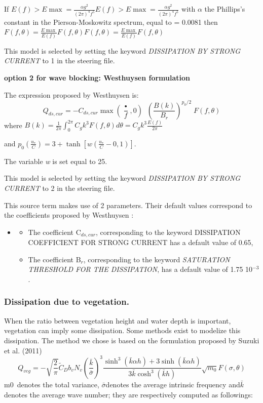 If $E(f)>E\max =\frac{\alpha g^{2} }{\left(2\pi \right)^{4} f^{5} } $$E(f)>E\max =\frac{\alpha g^{2} }{\left(2\pi \right)^{4} f^{5} } $ 
 with $\alpha$ the Phillips's constant in the Pierson-Moskowitz spectrum, equal to = 0.0081 then
$F(f,\theta )=\frac{E\max }{E(f)} F(f,\theta )$$F(f,\theta )=\frac{E\max }{E(f)} F(f,\theta )$

 This model is selected by setting the keyword \textit{DISSIPATION BY STRONG CURRENT }to 1 in the steering file.\textbf{}

{\bf  option 2 for wave blocking: Westhuysen formulation }

 The expression proposed by Westhuysen is:
\[Q_{ds,cur} =-C_{ds,cur} \max \left(\frac{\mathop{f_{r} }\limits^{\bullet } }{f} ,0\right)\; \; \left(\frac{B(k)}{B_{r} } \right)^{p_{0} /2} \; F(f,\theta )\]
where $B(k)=\frac{1}{2\pi } \int _{0}^{2\pi }C_{g} k^{3} F(f,\theta )d\theta  =C_{g} k^{3} \frac{E(f)}{2\pi } $

 and $p_{0} \left(\frac{u_{*} }{C} \right)=3+\tanh \left[w\left(\frac{u_{*} }{C} -0,1\right)\right]$.

 The variable \textit{w} is set equal to 25.

 This model is selected by setting the keyword \textit{DISSIPATION BY STRONG CURRENT} to 2 in the steering file.\textbf{}

 This source term makes use of 2 parameters. Their default values correspond to the coefficients proposed by Westhuysen \cite{Westhuys2012}:

\begin{itemize}
\item \begin{itemize}
\item  The coefficient C${}_{ds,cur}$, corresponding to the keyword DISSIPATION COEFFICIENT FOR STRONG CURRENT has a default value of 0.65,

\item  The coefficient B${}_{r}$, corresponding to the keyword \textit{SATURATION THRESHOLD FOR THE DISSIPATION}, has a default value of 1.75 10${}^{-3}$.
\end{itemize}
\end{itemize}


\subsubsection{ Dissipation due to vegetation.  }

 When the ratio between vegetation height and water depth is important, vegetation can imply some dissipation. Some methods exist  to modelize this dissipation. The method we chose is based on the formulation proposed by Suzuki et al. (2011)
\[Q_{veg} =-\sqrt{\frac{2}{\pi } } \tilde{C}_{D} b_{v} N_{v} \left(\frac{\bar{k}}{\bar{\sigma }} \right)^{3} \frac{\sinh ^{3} (\bar{k}\alpha h)+3\sinh (\bar{k}\alpha h)}{3\bar{k}\cosh ^{3} (\bar{k}h)} \sqrt{m_{0} } F(\sigma ,\theta )\]
m0~denotes the total variance, $\bar{\sigma }$denotes the average intrinsic frequency and$\bar{k}$ denotes the average wave number; they are respectively computed as followings:



